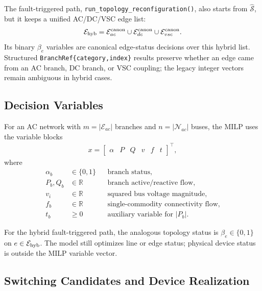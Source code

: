 The fault-triggered path, \texttt{run\_topology\_reconfiguration()}, also starts
from \(\widehat{\mathcal{S}}\), but it keeps a unified AC/DC/VSC edge list:
\begin{align}
\mathcal{E}_{\mathrm{hyb}} =
\mathcal{E}_{ac}^{\mathrm{canon}}
\cup \mathcal{E}_{dc}^{\mathrm{canon}}
\cup \mathcal{E}_{vsc}^{\mathrm{canon}} .
\end{align}
Its binary \(\beta_e\) variables are canonical edge-status decisions over this
hybrid list.  Structured \texttt{BranchRef\{category,index\}} results preserve
whether an edge came from an AC branch, DC branch, or VSC coupling; the legacy
integer vectors remain ambiguous in hybrid cases.

\subsection{Decision Variables}

For an AC network with \(m=|\mathcal{E}_{ac}|\) branches and
\(n=|\mathcal{N}_{ac}|\) buses, the MILP uses the variable blocks
\begin{align}
x = \begin{bmatrix}
\alpha & P & Q & v & f & t
\end{bmatrix}^{\top},
\end{align}
where
\begin{align}
\alpha_b &\in \{0,1\} && \text{branch status}, \\
P_b,Q_b &\in \mathbb{R} && \text{branch active/reactive flow}, \\
v_i &\in \mathbb{R} && \text{squared bus voltage magnitude}, \\
f_b &\in \mathbb{R} && \text{single-commodity connectivity flow}, \\
t_b &\ge 0 && \text{auxiliary variable for } |P_b|.
\end{align}

For the hybrid fault-triggered path, the analogous topology status is
\(\beta_e\in\{0,1\}\) on \(e\in\mathcal{E}_{\mathrm{hyb}}\).  The model still
optimizes line or edge status; physical device status is outside the MILP
variable vector.

\subsection{Switching Candidates and Device Realization}

